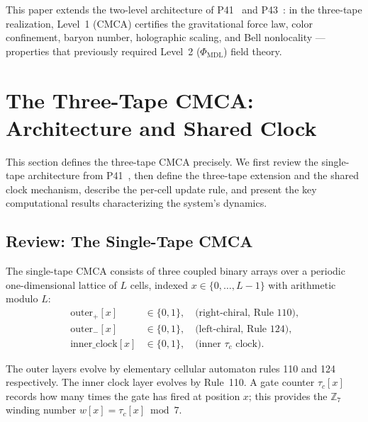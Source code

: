 \documentclass[11pt]{article}
\theoremstyle{remark}
\newcommand{\PHIMDL}{\Phi_{\mathrm{MDL}}}
\newcommand{\ZS}{\mathbb{Z}_7}
\newcommand{\CMCA}{\text{CMCA}}
\newcommand{\tauc}{\tau_c}
\begin{document}
This paper extends the two-level architecture of P41~\cite{SpivackCMCA} and
P43~\cite{SpivackCompleteness}: in the three-tape realization, Level~1
($\CMCA$) certifies the gravitational force law, color confinement, baryon
number, holographic scaling, and Bell nonlocality --- properties that previously
required Level~2 ($\PHIMDL$) field theory.

\FloatBarrier

\section{The Three-Tape CMCA: Architecture and Shared Clock}
\label{sec:architecture}

This section defines the three-tape $\CMCA$ precisely. We first review the
single-tape architecture from P41~\cite{SpivackCMCA}, then define the
three-tape extension and the shared clock mechanism, describe the per-cell
update rule, and present the key computational results characterizing the
system's dynamics.

\subsection{Review: The Single-Tape CMCA}

The single-tape $\CMCA$ consists of three coupled binary arrays over a
periodic one-dimensional lattice of $L$ cells, indexed $x \in \{0,\ldots,L-1\}$
with arithmetic modulo $L$:
\begin{align}
  \text{outer}_{+}[x] &\in \{0,1\}, \quad \text{(right-chiral, Rule~110),} \\
  \text{outer}_{-}[x] &\in \{0,1\}, \quad \text{(left-chiral, Rule~124),} \\
  \text{inner\_clock}[x] &\in \{0,1\}, \quad \text{(inner $\tauc$ clock).}
\end{align}

The outer layers evolve by elementary cellular automaton rules 110 and 124
respectively. The inner clock layer evolves by Rule~110. A gate counter
$\tauc[x]$ records how many times the gate has fired at position $x$; this
provides the $\ZS$ winding number $w[x] = \tauc[x] \bmod 7$.
\end{document}
